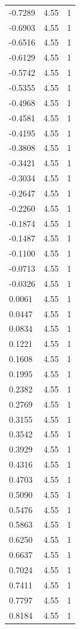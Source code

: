 \begin{longtable}{lrr}
  -0.7289 & 4.55 & 1 \\
  -0.6903 & 4.55 & 1 \\
  -0.6516 & 4.55 & 1 \\
  -0.6129 & 4.55 & 1 \\
  -0.5742 & 4.55 & 1 \\
  -0.5355 & 4.55 & 1 \\
  -0.4968 & 4.55 & 1 \\
  -0.4581 & 4.55 & 1 \\
  -0.4195 & 4.55 & 1 \\
  -0.3808 & 4.55 & 1 \\
  -0.3421 & 4.55 & 1 \\
  -0.3034 & 4.55 & 1 \\
  -0.2647 & 4.55 & 1 \\
  -0.2260 & 4.55 & 1 \\
  -0.1874 & 4.55 & 1 \\
  -0.1487 & 4.55 & 1 \\
  -0.1100 & 4.55 & 1 \\
  -0.0713 & 4.55 & 1 \\
  -0.0326 & 4.55 & 1 \\
  0.0061 & 4.55 & 1 \\
  0.0447 & 4.55 & 1 \\
  0.0834 & 4.55 & 1 \\
  0.1221 & 4.55 & 1 \\
  0.1608 & 4.55 & 1 \\
  0.1995 & 4.55 & 1 \\
  0.2382 & 4.55 & 1 \\
  0.2769 & 4.55 & 1 \\
  0.3155 & 4.55 & 1 \\
  0.3542 & 4.55 & 1 \\
  0.3929 & 4.55 & 1 \\
  0.4316 & 4.55 & 1 \\
  0.4703 & 4.55 & 1 \\
  0.5090 & 4.55 & 1 \\
  0.5476 & 4.55 & 1 \\
  0.5863 & 4.55 & 1 \\
  0.6250 & 4.55 & 1 \\
  0.6637 & 4.55 & 1 \\
  0.7024 & 4.55 & 1 \\
  0.7411 & 4.55 & 1 \\
  0.7797 & 4.55 & 1 \\
  0.8184 & 4.55 & 1 \\

\end{longtable}
